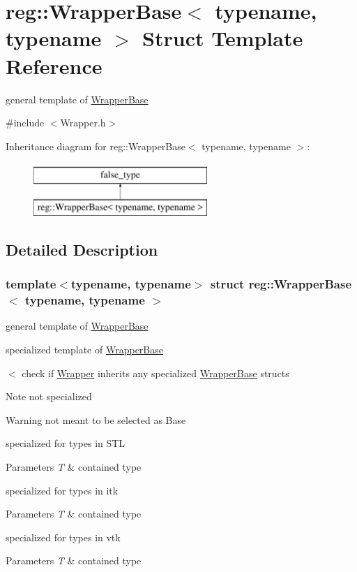 \hypertarget{structreg_1_1_wrapper_base}{}\section{reg\+:\+:Wrapper\+Base$<$ typename, typename $>$ Struct Template Reference}
\label{structreg_1_1_wrapper_base}


general template of \hyperlink{structreg_1_1_wrapper_base}{Wrapper\+Base}  




{\ttfamily \#include $<$Wrapper.\+h$>$}

Inheritance diagram for reg\+:\+:Wrapper\+Base$<$ typename, typename $>$\+:\begin{figure}[H]
\begin{center}
\leavevmode
\includegraphics[height=2.000000cm]{structreg_1_1_wrapper_base}
\end{center}
\end{figure}


\subsection{Detailed Description}
\subsubsection*{template$<$typename, typename$>$\newline
struct reg\+::\+Wrapper\+Base$<$ typename, typename $>$}

general template of \hyperlink{structreg_1_1_wrapper_base}{Wrapper\+Base} 

specialized template of \hyperlink{structreg_1_1_wrapper_base}{Wrapper\+Base}

$<$ check if \hyperlink{structreg_1_1_wrapper}{Wrapper} inherits any specialized \hyperlink{structreg_1_1_wrapper_base}{Wrapper\+Base} structs

\begin{DoxyNote}{Note}
not specialized 
\end{DoxyNote}
\begin{DoxyWarning}{Warning}
not meant to be selected as Base
\end{DoxyWarning}
specialized for types in S\+TL 
\begin{DoxyParams}{Parameters}
{\em T} & contained type\\
\hline
\end{DoxyParams}
specialized for types in itk 
\begin{DoxyParams}{Parameters}
{\em T} & contained type\\
\hline
\end{DoxyParams}
specialized for types in vtk 
\begin{DoxyParams}{Parameters}
{\em T} & contained type \\
\hline
\end{DoxyParams}


